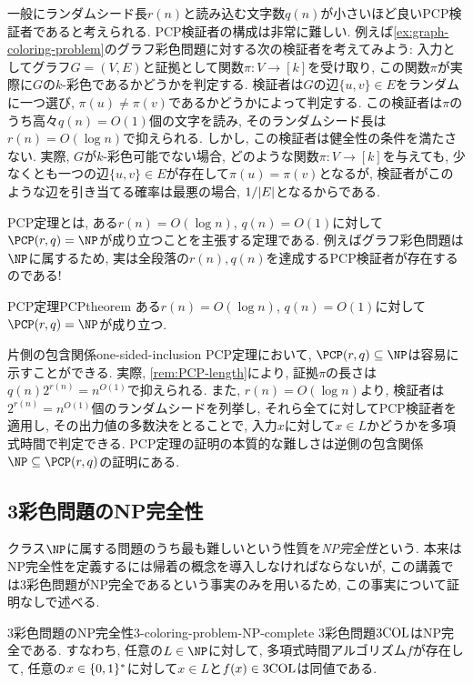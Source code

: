 一般にランダムシード長$r(n)$と読み込む文字数$q(n)$が小さいほど良いPCP検証者であると考えられる.
PCP検証者の構成は非常に難しい.
例えば\cref{ex:graph-coloring-problem}のグラフ彩色問題に対する次の検証者を考えてみよう:
入力としてグラフ$G=(V,E)$と証拠として関数$\pi\colon V\to[k]$を受け取り, この関数$\pi$が実際に$G$の$k$-彩色であるかどうかを判定する.
検証者は$G$の辺$\{u,v\}\in E$をランダムに一つ選び, $\pi(u)\neq \pi(v)$であるかどうかによって判定する.
この検証者は$\pi$のうち高々$q(n)=O(1)$個の文字を読み, そのランダムシード長は$r(n)=O(\log n)$で抑えられる.
しかし, この検証者は健全性の条件を満たさない.
実際, $G$が$k$-彩色可能でない場合, どのような関数$\pi\colon V \to [k]$を与えても, 少なくとも一つの辺$\{u,v\}\in E$が存在して$\pi(u)=\pi(v)$となるが, 検証者がこのような辺を引き当てる確率は最悪の場合, $1/\abs{E}$となるからである.

PCP定理とは, ある$r(n)=O(\log n)$, $q(n)=O(1)$に対して$\PCP(r,q)=\NP$が成り立つことを主張する定理である.
例えばグラフ彩色問題は$\NP$に属するため, 実は全段落の$r(n),q(n)$を達成するPCP検証者が存在するのである!

\begin{theorem}{PCP定理}{PCPtheorem}
  ある$r(n)=O(\log n)$, $q(n)=O(1)$に対して$\PCP(r,q)=\NP$が成り立つ.
\end{theorem}

\begin{remark}{片側の包含関係}{one-sided-inclusion}
  PCP定理において, $\PCP(r,q)\subseteq \NP$は容易に示すことができる.
  実際, \cref{rem:PCP-length}により, 証拠$\pi$の長さは$q(n)2^{r(n)} = n^{O(1)}$で抑えられる.
  また, $r(n)=O(\log n)$より, 検証者は$2^{r(n)}=n^{O(1)}$個のランダムシードを列挙し, それら全てに対してPCP検証者を適用し, その出力値の多数決をとることで, 入力$x$に対して$x\in L$かどうかを多項式時間で判定できる.
  PCP定理の証明の本質的な難しさは逆側の包含関係$\NP\subseteq \PCP(r,q)$の証明にある.
\end{remark}

\subsection{3彩色問題のNP完全性}

クラス$\NP$に属する問題のうち最も難しいという性質を\emph{NP完全性}という.
本来はNP完全性を定義するには帰着の概念を導入しなければならないが, この講義では3彩色問題がNP完全であるという事実のみを用いるため,
この事実について証明なしで述べる.

\begin{theorem}{3彩色問題のNP完全性}{3-coloring-problem-NP-complete}
  3彩色問題$\mathrm{3COL}$はNP完全である. すなわち, 任意の$L\in\NP$に対して, 多項式時間アルゴリズム$f$が存在して, 任意の$x\in\{0,1\}^*$に対して$x\in L$と$f(x)\in\mathrm{3COL}$は同値である.
\end{theorem}

